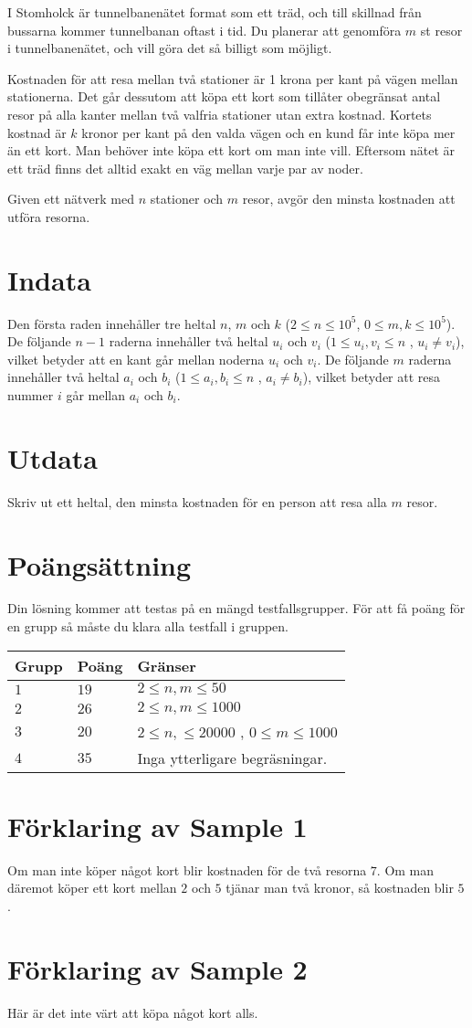 I Stomholck är tunnelbanenätet format som ett träd, och till skillnad från bussarna kommer tunnelbanan oftast i tid.
Du planerar att genomföra $m$ st resor i tunnelbanenätet, och vill göra det så billigt som möjligt.
 
Kostnaden för att resa mellan två stationer är 1 krona per kant på vägen mellan stationerna. 
Det går dessutom att köpa ett kort som tillåter obegränsat antal resor på alla kanter mellan två valfria stationer utan extra kostnad.
Kortets kostnad är $k$ kronor per kant på den valda vägen och en kund får inte köpa mer än ett kort.
Man behöver inte köpa ett kort om man inte vill. Eftersom nätet är ett träd finns det alltid exakt en väg mellan varje par av noder.

Given ett nätverk med $n$ stationer och $m$ resor, avgör den minsta kostnaden att utföra resorna.

\section*{Indata}
Den första raden innehåller tre heltal $n$, $m$ och $k$ ($2 \leq n \leq 10^5$, $0 \leq m, k \leq 10^5$).
De följande $n-1$ raderna innehåller två heltal $u_i$ och $v_i$ ($1 \leq u_i , v_i \leq n$ , $u_i \neq v_i$), vilket betyder
att en kant går mellan noderna $u_i$ och $v_i$.
De följande $m$ raderna innehåller två heltal $a_i$ och $b_i$ ($1 \leq a_i , b_i \leq n$ , $a_i \neq b_i$), vilket betyder 
att resa nummer $i$ går mellan $a_i$ och $b_i$.

\section*{Utdata}
Skriv ut ett heltal, den minsta kostnaden för en person att resa alla $m$ resor.

\section*{Poängsättning}
Din lösning kommer att testas på en mängd testfallsgrupper. För att få poäng för en grupp så måste du klara alla testfall i gruppen.

\noindent
\begin{tabular}{| l | l | p{12cm} |}
  \hline
  \textbf{Grupp} & \textbf{Poäng} & \textbf{Gränser} \\ \hline
  $1$    & $19$      & $2 \le n, m \le 50$ \\ \hline
  $2$    & $26$      & $2 \le n, m \le 1000$ \\ \hline
  $3$    & $20$      & $2 \le n, \le 20000$ , $0 \le m \le 1000$ \\ \hline
  $4$    & $35$      & Inga ytterligare begräsningar. \\ \hline
\end{tabular}

\section*{Förklaring av Sample 1}
Om man inte köper något kort blir kostnaden för de två resorna $7$. Om man däremot köper
ett kort mellan $2$ och $5$ tjänar man två kronor, så kostnaden blir $5$.

\section*{Förklaring av Sample 2}
Här är det inte värt att köpa något kort alls.
